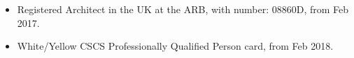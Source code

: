 \begin{licences}
    \begin{itemize}[leftmargin=0.45cm, itemsep=0em, topsep=0.5em, parsep=0.2em]
        \item
        Registered Architect in the UK at the ARB, with number: 08860D, from Feb 2017.
        \item
        White/Yellow CSCS Professionally Qualified Person card, from Feb 2018.
    \end{itemize}
\end{licences}
